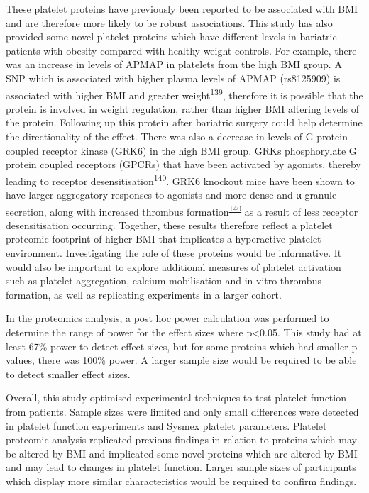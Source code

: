 \documentclass[11pt,twoside]{bristolthesis}
\begin{document}
These platelet proteins have previously been reported to be associated with BMI and are therefore more likely to be robust associations. This study has also provided some novel platelet proteins which have different levels in bariatric patients with obesity compared with healthy weight controls. For example, there was an increase in levels of APMAP in platelets from the high BMI group. A SNP which is associated with higher plasma levels of APMAP (rs8125909) is associated with higher BMI and greater weight\textsuperscript{\protect\hyperlink{ref-Liu2021}{139}}, therefore it is possible that the protein is involved in weight regulation, rather than higher BMI altering levels of the protein. Following up this protein after bariatric surgery could help determine the directionality of the effect. There was also a decrease in levels of G protein-coupled receptor kinase (GRK6) in the high BMI group. GRKs phosphorylate G protein coupled receptors (GPCRs) that have been activated by agonists, thereby leading to receptor desensitisation\textsuperscript{\protect\hyperlink{ref-Chaudhary2020}{140}}. GRK6 knockout mice have been shown to have larger aggregatory responses to agonists and more dense and α-granule secretion, along with increased thrombus formation\textsuperscript{\protect\hyperlink{ref-Chaudhary2020}{140}} as a result of less receptor desensitisation occurring. Together, these results therefore reflect a platelet proteomic footprint of higher BMI that implicates a hyperactive platelet environment. Investigating the role of these proteins would be informative. It would also be important to explore additional measures of platelet activation such as platelet aggregation, calcium mobilisation and in vitro thrombus formation, as well as replicating experiments in a larger cohort.

In the proteomics analysis, a post hoc power calculation was performed to determine the range of power for the effect sizes where p\textless0.05. This study had at least 67\% power to detect effect sizes, but for some proteins which had smaller p values, there was 100\% power. A larger sample size would be required to be able to detect smaller effect sizes.

Overall, this study optimised experimental techniques to test platelet function from patients. Sample sizes were limited and only small differences were detected in platelet function experiments and Sysmex platelet parameters. Platelet proteomic analysis replicated previous findings in relation to proteins which may be altered by BMI and implicated some novel proteins which are altered by BMI and may lead to changes in platelet function. Larger sample sizes of participants which display more similar characteristics would be required to confirm findings.
\end{document}
